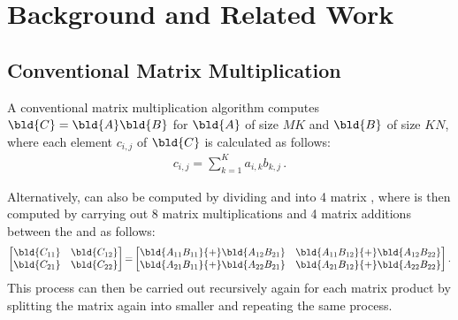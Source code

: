 \section{Background and Related Work}
\label{smm:sec:background}
\subsection{Conventional Matrix Multiplication}
A conventional matrix multiplication algorithm
computes $\bld{C} = \bld{A} \bld{B}$ for $\bld{A}$ of size $M$\by$K$ and $\bld{B}$ of size $K$\by$N$, where each element $c_{i,j}$ of $\bld{C}$ is calculated as follows:
\begin{align} \label{smm:eq:mmZero}
  c_{i,j} = \sum_{k=1}^{K} a_{i,k} b_{k,j} \,.
\end{align}

Alternatively, \C can also be computed by dividing \A and \B into 4 matrix \blocks, where \C is then computed by carrying out 8 matrix \block multiplications and 4 matrix \block additions between the \A and \B \blocks as follows:
\begin{align}
  \label{smm:eq:mm}
  \begin{bmatrix}
    \bld{C_{11}} & \bld{C_{12}} \\
    \bld{C_{21}} & \bld{C_{22}}
  \end{bmatrix}{=}\begin{bmatrix}
    \bld{A_{11}B_{11}}{+}\bld{A_{12}B_{21}} & \bld{A_{11}B_{12}}{+}\bld{A_{12}B_{22}}\\
    \bld{A_{21}B_{11}}{+}\bld{A_{22}B_{21}} & \bld{A_{21}B_{12}}{+}\bld{A_{22}B_{22}} \end{bmatrix} .
\end{align}
This process can then be carried out recursively again for each matrix \block product by splitting the matrix \blocks again into smaller \blocks and repeating the same process.

